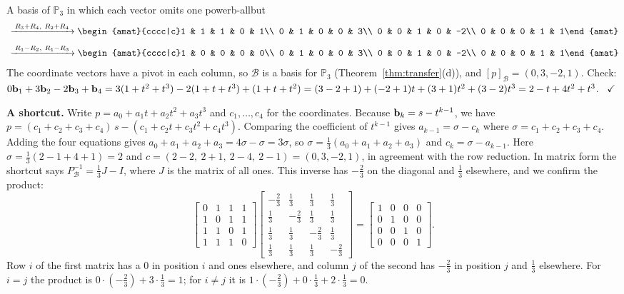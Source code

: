 \documentclass[11pt]{article}
\begin{document}
\begin{exmp}{A basis of $\mathbb P_3$ in which each vector omits one power}{b-allbut}
\begin{align*}
&\rops{R_3+R_4,\ R_2+R_4}
\begin{amat}{cccc|c}1 & 1 & 1 & 0 & 1\\ 0 & 1 & 0 & 0 & 3\\ 0 & 0 & 1 & 0 & -2\\ 0 & 0 & 0 & 1 & 1\end{amat}
\\[4pt]
&\rops{R_1-R_2,\ R_1-R_3}
\begin{amat}{cccc|c}1 & 0 & 0 & 0 & 0\\ 0 & 1 & 0 & 0 & 3\\ 0 & 0 & 1 & 0 & -2\\ 0 & 0 & 0 & 1 & 1\end{amat}
\end{align*}
The coordinate vectors have a pivot in each column, so $\mathcal{B}$ is a basis for $\mathbb{P}_3$ (Theorem~\ref{thm:transfer}(d)), and $[p]_{\mathcal{B}}=(0,3,-2,1)$. Check: $0\mathbf{b}_1+3\mathbf{b}_2-2\mathbf{b}_3+\mathbf{b}_4=3(1+t^2+t^3)-2(1+t+t^3)+(1+t+t^2)=(3-2+1)+(-2+1)t+(3+1)t^2+(3-2)t^3=2-t+4t^2+t^3$. \ $\checkmark$

\textbf{A shortcut.} Write $p=a_0+a_1t+a_2t^2+a_3t^3$ and $c_1,\dots,c_4$ for the coordinates. Because $\mathbf{b}_k=s-t^{k-1}$, we have $p=(c_1+c_2+c_3+c_4)\,s-(c_1+c_2t+c_3t^2+c_4t^3)$. Comparing the coefficient of $t^{k-1}$ gives $a_{k-1}=\sigma-c_k$ where $\sigma=c_1+c_2+c_3+c_4$. Adding the four equations gives $a_0+a_1+a_2+a_3=4\sigma-\sigma=3\sigma$, so $\sigma=\tfrac13(a_0+a_1+a_2+a_3)$ and $c_k=\sigma-a_{k-1}$. Here $\sigma=\tfrac13(2-1+4+1)=2$ and $c=(2-2,\ 2+1,\ 2-4,\ 2-1)=(0,3,-2,1)$, in agreement with the row reduction. In matrix form the shortcut says $P_{\mathcal{B}}^{-1}=\tfrac13 J-I$, where $J$ is the matrix of all ones. This inverse has $-\tfrac23$ on the diagonal and $\tfrac13$ elsewhere, and we confirm the product:
\[
\begin{bmatrix}0&1&1&1\\1&0&1&1\\1&1&0&1\\1&1&1&0\end{bmatrix}
\begin{bmatrix}-\tfrac{2}{3}&\tfrac{1}{3}&\tfrac{1}{3}&\tfrac{1}{3}\\\tfrac{1}{3}&-\tfrac{2}{3}&\tfrac{1}{3}&\tfrac{1}{3}\\\tfrac{1}{3}&\tfrac{1}{3}&-\tfrac{2}{3}&\tfrac{1}{3}\\\tfrac{1}{3}&\tfrac{1}{3}&\tfrac{1}{3}&-\tfrac{2}{3}\end{bmatrix}
=\begin{bmatrix}1&0&0&0\\0&1&0&0\\0&0&1&0\\0&0&0&1\end{bmatrix}.
\]
Row $i$ of the first matrix has a $0$ in position $i$ and ones elsewhere, and column $j$ of the second has $-\tfrac23$ in position $j$ and $\tfrac13$ elsewhere. For $i=j$ the product is $0\cdot(-\tfrac23)+3\cdot\tfrac13=1$; for $i\neq j$ it is $1\cdot(-\tfrac23)+0\cdot\tfrac13+2\cdot\tfrac13=0$.
\end{exmp}
\end{document}
